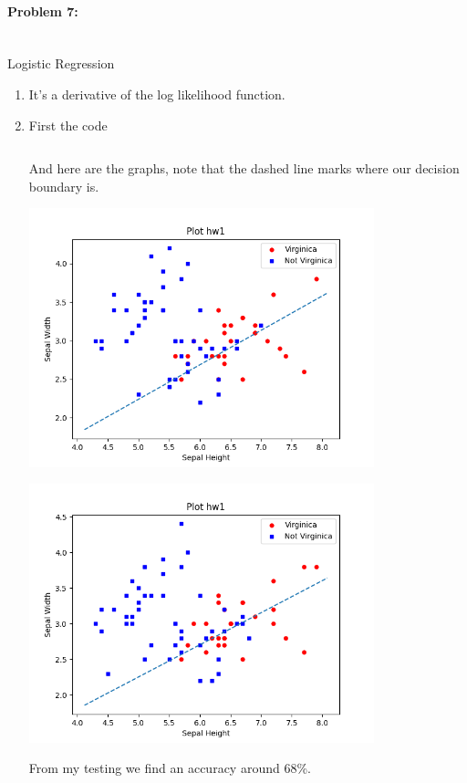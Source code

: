 \documentclass[12pt]{article}
\begin{document}
    \paragraph{Problem 7:}~\\
    Logistic Regression
    \begin{enumerate}
        \item It's a derivative of the log likelihood function.
        \item 
        First the code
        \inputminted{python}{hw1.py}

        And here are the graphs, note that the dashed line marks where our
        decision boundary is.
        \begin{center}
        

            \includegraphics[width=10cm]{Figure_1.png}
        
        
            \includegraphics[width=10cm]{Figure_2.png}
        \end{center}
        From my testing we find an accuracy around 68\%.
    \end{enumerate}
\end{document}
